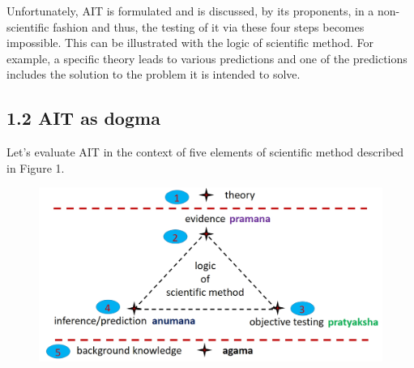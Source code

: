 Unfortunately, AIT is formulated and is discussed, by its proponents, in a non-scientific fashion and thus, the testing of it via these four steps becomes impossible. This can be illustrated with the logic of scientific method. For example, a specific theory leads to various predictions and one of the predictions includes the solution to the problem it is intended to solve.


\subsection*{1.2 AIT as dogma}

Let’s evaluate AIT in the context of five elements of scientific method described in Figure 1.

\begin{figure}[!htbp]
\includegraphics[scale=0.2]{"images/8-01.jpg"}
\caption{}\label{art8-fig01}
\end{figure}

